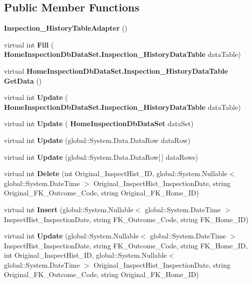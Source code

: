 \subsection*{Public Member Functions}
\begin{DoxyCompactItemize}
\item 
\textbf{ Inspection\+\_\+\+History\+Table\+Adapter} ()
\item 
virtual int \textbf{ Fill} (\textbf{ Home\+Inspection\+Db\+Data\+Set.\+Inspection\+\_\+\+History\+Data\+Table} data\+Table)
\item 
virtual \textbf{ Home\+Inspection\+Db\+Data\+Set.\+Inspection\+\_\+\+History\+Data\+Table} \textbf{ Get\+Data} ()
\item 
virtual int \textbf{ Update} (\textbf{ Home\+Inspection\+Db\+Data\+Set.\+Inspection\+\_\+\+History\+Data\+Table} data\+Table)
\item 
virtual int \textbf{ Update} (\textbf{ Home\+Inspection\+Db\+Data\+Set} data\+Set)
\item 
virtual int \textbf{ Update} (global\+::\+System.\+Data.\+Data\+Row data\+Row)
\item 
virtual int \textbf{ Update} (global\+::\+System.\+Data.\+Data\+Row[$\,$] data\+Rows)
\item 
virtual int \textbf{ Delete} (int Original\+\_\+\+Inspect\+Hist\+\_\+\+ID, global\+::\+System.\+Nullable$<$ global\+::\+System.\+Date\+Time $>$ Original\+\_\+\+Inspect\+Hist\+\_\+\+Inspection\+Date, string Original\+\_\+\+F\+K\+\_\+\+Outcome\+\_\+\+Code, string Original\+\_\+\+F\+K\+\_\+\+Home\+\_\+\+ID)
\item 
virtual int \textbf{ Insert} (global\+::\+System.\+Nullable$<$ global\+::\+System.\+Date\+Time $>$ Inspect\+Hist\+\_\+\+Inspection\+Date, string F\+K\+\_\+\+Outcome\+\_\+\+Code, string F\+K\+\_\+\+Home\+\_\+\+ID)
\item 
virtual int \textbf{ Update} (global\+::\+System.\+Nullable$<$ global\+::\+System.\+Date\+Time $>$ Inspect\+Hist\+\_\+\+Inspection\+Date, string F\+K\+\_\+\+Outcome\+\_\+\+Code, string F\+K\+\_\+\+Home\+\_\+\+ID, int Original\+\_\+\+Inspect\+Hist\+\_\+\+ID, global\+::\+System.\+Nullable$<$ global\+::\+System.\+Date\+Time $>$ Original\+\_\+\+Inspect\+Hist\+\_\+\+Inspection\+Date, string Original\+\_\+\+F\+K\+\_\+\+Outcome\+\_\+\+Code, string Original\+\_\+\+F\+K\+\_\+\+Home\+\_\+\+ID)
\end{DoxyCompactItemize}
